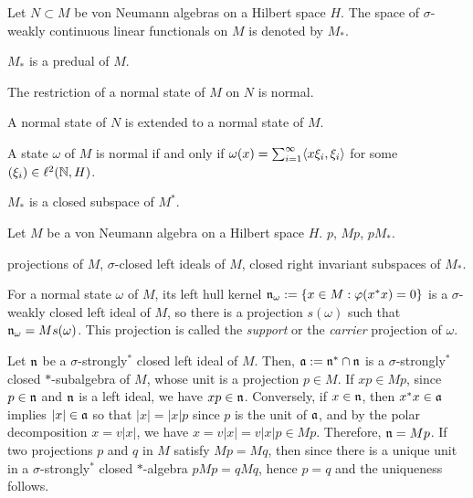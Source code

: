 \documentclass{../../large}
\begin{document}
\begin{prb}
Let $N\subset M$ be von Neumann algebras on a Hilbert space $H$.
The space of $\sigma$-weakly continuous linear functionals on $M$ is denoted by $M_*$.
\begin{parts}
\item $M_*$ is a predual of $M$.
\item The restriction of a normal state of $M$ on $N$ is normal.
\item A normal state of $N$ is extended to a normal state of $M$.
\item A state $\omega$ of $M$ is normal if and only if $\omega(x)=\sum_{i=1}^\infty\langle x\xi_i,\xi_i\rangle$ for some $(\xi_i)\in\ell^2(\mathbb{N},H)$.
\item $M_*$ is a closed subspace of $M^*$.
\end{parts}
\end{prb}


\begin{prb}
Let $M$ be a von Neumann algebra on a Hilbert space $H$.
$p$, $Mp$, $pM_*$.


\begin{parts}
\item projections of $M$, $\sigma$-closed left ideals of $M$, closed right invariant subspaces of $M_*$.
\item For a normal state $\omega$ of $M$, its left hull kernel $\mathfrak{n}_\omega:=\{x\in M:\varphi(x^*x)=0\}$ is a $\sigma$-weakly closed left ideal of $M$, so there is a projection $s(\omega)$ such that $\mathfrak{n}_\omega=Ms(\omega)$. This projection is called the \emph{support} or the \emph{carrier} projection of $\omega$.
\end{parts}
\end{prb}
\begin{pf}
Let $\mathfrak{n}$ be a $\sigma$-strongly$^*$ closed left ideal of $M$.
Then, $\mathfrak{a}:=\mathfrak{n}^*\cap\mathfrak{n}$ is a $\sigma$-strongly$^*$ closed $*$-subalgebra of $M$, whose unit is a projection $p\in M$.
If $xp\in Mp$, since $p\in\mathfrak{n}$ and $\mathfrak{n}$ is a left ideal, we have $xp\in\mathfrak{n}$.
Conversely, if $x\in\mathfrak{n}$, then $x^*x\in\mathfrak{a}$ implies $|x|\in\mathfrak{a}$ so that $|x|=|x|p$ since $p$ is the unit of $\mathfrak{a}$, and by the polar decomposition $x=v|x|$, we have $x=v|x|=v|x|p\in Mp$.
Therefore, $\mathfrak{n}=Mp$.
If two projections $p$ and $q$ in $M$ satisfy $Mp=Mq$, then since there is a unique unit in a $\sigma$-strongly$^*$ closed $*$-algebra $pMp=qMq$, hence $p=q$ and the uniqueness follows.

\end{pf}
\end{document}
